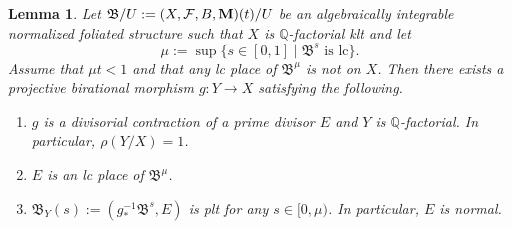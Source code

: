 \documentclass[11pt,reqno]{amsart}
\numberwithin{equation}{section}
\newcommand{\Mm}{{\bf{M}}}
\newcommand{\Bb}{{\mathfrak{B}}}
\newcommand{\Ff}{\mathcal{F}}
\newtheorem{lem}[thm]{Lemma}
\theoremstyle{definition}
\begin{document}
\begin{lem}\label{lem: extract unique lc place}
Let $\Bb/U:=(X,\Ff,B,\Mm)(t)/U$ be an algebraically integrable normalized foliated structure such that $X$ is $\mathbb Q$-factorial klt and let 
$$\mu:=\sup\{s\in [0,1]\mid \Bb^s\text{ is lc}\}.$$
Assume that $\mu t<1$ and that any lc place of $\Bb^{\mu}$ is not on $X$. Then there exists a projective birational morphism $g: Y\rightarrow X$ satisfying the following.
\begin{enumerate}
    \item $g$ is a divisorial contraction of a prime divisor $E$ and $Y$ is $\mathbb Q$-factorial. In particular, $\rho(Y/X)=1$.
    \item $E$ is an lc place of $\Bb^{\mu}$.
    \item $\Bb_Y(s):=(g^{-1}_*\Bb^s,E)$ is plt for any $s\in [0,\mu)$. In particular, $E$ is normal.
\end{enumerate}
\end{lem}
\end{document}
